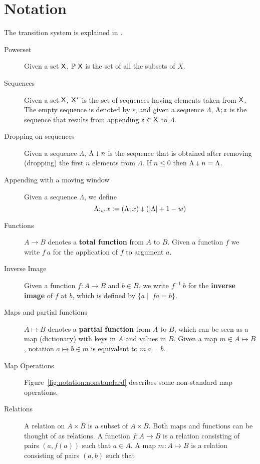 \section{Notation}
\label{sec:notation-shelley}

The transition system is explained in \cite{small_step_semantics}.

\begin{description}
  \item[Powerset] Given a set $\mathsf{X}$, $\mathbb{P}~\mathsf{X}$ is the set of all
    the subsets of $X$.
  \item[Sequences] Given a set $\mathsf{X}$, $\mathsf{X}^{*}$ is the set of
    sequences having elements taken from $\mathsf{X}$. The empty sequence is
    denoted by $\epsilon$, and given a sequence $\Lambda$, $\Lambda; \mathsf{x}$ is
    the sequence that results from appending $\mathsf{x} \in \mathsf{X}$ to
    $\Lambda$.
  \item[Dropping on sequences] Given a sequence $\Lambda$,
    $\Lambda \shortdownarrow n$ is the sequence that is obtained after removing
    (dropping) the first $n$ elements from $\Lambda$. If $n \leq 0$ then
    $\Lambda \shortdownarrow n = \Lambda$.
  \item[Appending with a moving window] Given a sequence $\Lambda$, we define
    $$\Lambda ;_w x \mathrel{\mathop:}= (\Lambda; x) \shortdownarrow (\left| \Lambda \right| + 1 - w)$$
  \item[Functions] $A \to B$ denotes a \textbf{total function} from $A$ to $B$.
    Given a function $f$ we write $f~a$ for the application of $f$ to argument
    $a$.
  \item[Inverse Image] Given a function $f: A \to B$ and $b\in B$, we write
    $f^{-1}~b$ for the \textbf{inverse image} of $f$ at $b$, which is defined by
    $\{a \mid\ f a =  b\}$.
  \item[Maps and partial functions] $A \mapsto B$ denotes a \textbf{partial
    function} from $A$ to $B$, which can be seen as a map (dictionary) with
    keys in $A$ and values in $B$. Given a map $m \in A \mapsto B$, notation
    $a \mapsto b \in m$ is equivalent to $m~ a = b$.
  \item[Map Operations] Figure~\ref{fig:notation:nonstandard}
    describes some non-standard map operations.
  \item[Relations] A relation on $A\times B$ is a subset of $A\times B$.
    Both maps and functions can be thought of as relations.
    A function $f:A\to B$ is a relation consisting of pairs $(a, f(a))$ such that $a\in A$.
    A map $m: A\mapsto B$ is a relation consisting of pairs $(a, b)$ such that

\end{description}
